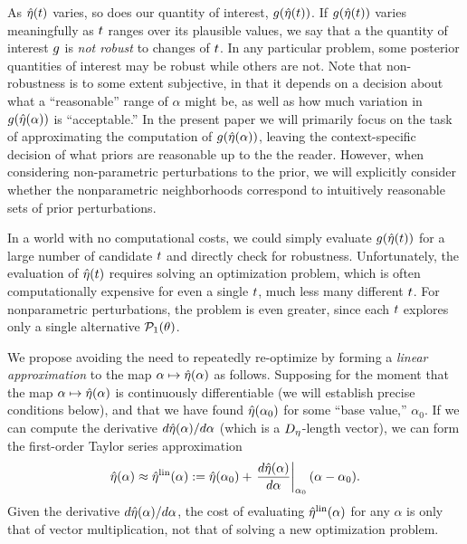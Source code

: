 As $\hat\eta(t)$ varies, so does our quantity of interest, $g(\hat\eta(t))$. If
$g(\hat\eta(t))$ varies meaningfully as $t$ ranges over its plausible values,
we say that a the quantity of interest $g$ is {\em not robust} to changes of
$t$.  In any particular problem, some posterior quantities of interest may be
robust while others are not.
%
Note that non-robustness is to some extent subjective, in that it depends on a
decision about what a ``reasonable'' range of $\alpha$ might be, as well as how
much variation in $g(\hat\eta(\alpha))$ is ``acceptable.''  In the present paper
we will primarily focus on the task of approximating the computation of
$g(\hat\eta(\alpha))$, leaving the context-specific decision of what priors are
reasonable up to the the reader.  However, when considering non-parametric
perturbations to the prior, we will explicitly consider whether the
nonparametric neighborhoods correspond to intuitively reasonable sets of prior
perturbations.

In a world with no computational costs, we could simply evaluate
$g(\hat\eta(t))$ for a large number of candidate $t$ and directly
check for robustness.  Unfortunately, the evaluation of $\hat\eta(t)$
requires solving an optimization problem, which is often computationally
expensive for even a single $t$, much less many different $t$.  For
nonparametric perturbations, the problem is even greater, since each $t$
explores only a single alternative $\mathcal{P}_{1}(\theta)$.

We propose avoiding the need to repeatedly re-optimize by forming a {\em linear
approximation} to the map $\alpha \mapsto \hat\eta(\alpha)$ as follows. Supposing
for the moment that the map $\alpha \mapsto \hat\eta(\alpha)$ is continuously
differentiable (we will establish precise conditions below), and that we have
found $\hat\eta(\alpha_0)$ for some ``base value,'' $\alpha_0$.  If we can
compute the derivative $d \hat\eta(\alpha) / d\alpha$ (which is a
${D_{\eta}}$-length vector), we can form the first-order Taylor series
approximation
%
\begin{align*}
%
\etaopt(\alpha) \approx \etalin(\alpha) :={}
    \etaopt(\alpha_0) +
    \fracat{d \etaopt(\alpha)}{d\alpha}{\alpha_0} (\alpha - \alpha_0).
%
\end{align*}
%
Given the derivative $d \hat\eta(\alpha) / d\alpha$, the cost of evaluating
$\hat\eta^{\mathrm{lin}}(\alpha)$ for any $\alpha$ is only that of vector multiplication, not
that of solving a new optimization problem.

